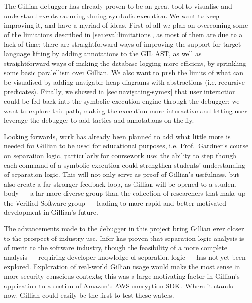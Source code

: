 
The Gillian debugger has already proven to be an great tool to visualise and
understand events occuring during symbolic execution. We want to keep improving
it, and have a myriad of ideas. First of all we plan on overcoming some of the
limiations described in \autoref{sec:eval:limitations}, as most of them are due
to a lack of time: there are straightforward ways of improving the support for 
target language lifting by adding annotations to the GIL AST, as well as
straightforward ways of making the database logging more efficient, by
sprinkling some basic paralellism over Gillian. We also want to push the limits
of what can be visualised by adding navigable heap diagrams with abstractions
(i.e. recursive predicates). Finally, we showed in
\autoref{sec:navigating-symex} that user interaction could be fed back into
the symbolic execution engine through the debugger; we want to explore this
path, making the execution more interactive and letting user leverage the
debugger to add tactics and annotations on the fly.

Looking forwards, work has already been planned to add what little more is
needed for Gillian to be used for educational purposes, i.e. Prof.\ Gardner's
course on separation logic, particularly for coursework use; the ability to step
though each command of a symbolic execution could strengthen students'
understanding of separation logic. This will not only serve as proof of
Gillian's usefulness, but also create a far stronger feedback loop, as Gillian
will be opened to a student body --- a far more diverse group than the
collection of researchers that make up the Verified Software group --- leading
to more rapid and better motivated development in Gillian's future.

The advancements made to the debugger in this project bring Gillian ever closer
to the prospect of industry use. Infer has proven that separation logic analysis
is of merit to the software industry, though the feasibility of a more complete
analysis --- requiring developer knowledge of separation logic --- has not yet
been explored. Exploration of real-world Gillian usage would make the most sense
in more security-conscious contexts; this was a large motivating factor in
Gillian's application to a section of Amazon's AWS encryption SDK.\ Where it
stands now, Gillian could easily be the first to test these waters. 

